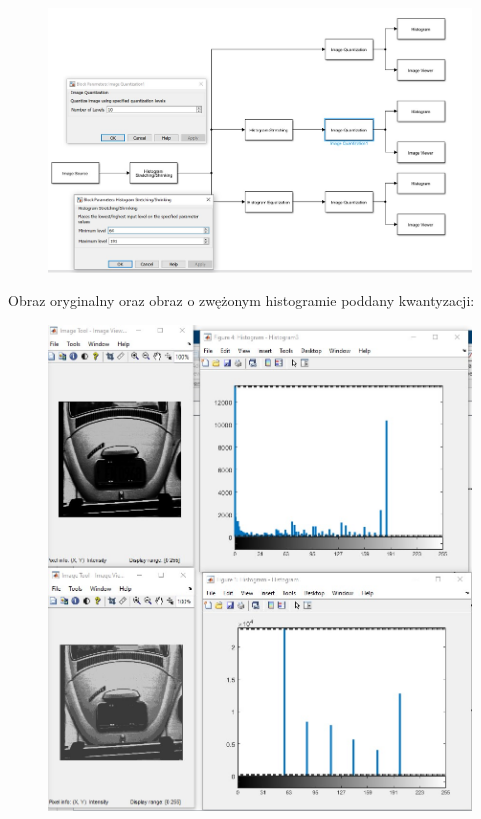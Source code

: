 \documentclass{article}
\begin{document}
\begin{figure}[h!]
    \centering
    \includegraphics[scale=0.5]{zad2_model.jpg}
\end{figure}

\newpage

Obraz oryginalny oraz obraz o zwężonym histogramie poddany kwantyzacji:

\begin{figure}[h!]
    \centering
    \includegraphics[scale=0.5]{zad2_a.jpg}
\end{figure}
\end{document}
